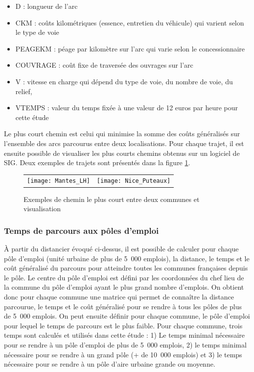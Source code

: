 \documentclass[10.5pt,a4paper]{article}
\begin{document}
{\begin{itemize}[font=\tiny]
	\item D : longueur de l'arc
	\item CKM : coûts kilométriques (essence, entretien du véhicule) qui varient selon le type de voie
	\item PEAGEKM : péage par kilomètre sur l'arc qui varie selon le concessionnaire
	\item COUVRAGE : coût fixe de traversée des ouvrages sur l'arc
	\item V : vitesse en charge qui dépend du type de voie, du nombre de voie, du relief, 
	\item VTEMPS : valeur du temps fixée à une valeur de 12 euros par heure pour cette étude
\end{itemize}

Le plus court chemin est celui qui minimise la somme des coûts généralisés sur l'ensemble des arcs parcourus entre deux localisations. Pour chaque trajet, il est ensuite possible de visualiser les plus courts chemins obtenus sur un logiciel de SIG. Deux exemples de trajets sont présentés dans la figure \ref{path_MODEV}. \par

\begin{figure}[h!]%
\caption{Exemples de chemin le plus court entre deux communes et visualisation}
\begin{tabular}{cc}
\texttt{[image: Mantes\_LH]}  & \texttt{[image: Nice\_Puteaux]}  \\
\end{tabular}
\label{path_MODEV}
\end{figure}

\subsubsection{Temps de parcours aux pôles d'emploi}

\`{A} partir du distancier évoqué ci-dessus, il est possible de calculer pour chaque pôle d'emploi (unité urbaine de plus de 5~000 emplois), la distance, le temps et  le coût généralisé du parcours pour atteindre toutes les communes françaises depuis le pôle. Le centre du pôle d'emploi est défini par les coordonnées du chef lieu de la commune du pôle d'emploi ayant le plus grand nombre d'emplois. On obtient donc pour chaque commune une matrice qui permet de connaître la distance parcourue, le temps et  le coût généralisé pour se rendre à tous les pôles de plus de 5~000 emplois. On peut ensuite définir pour chaque commune, le pôle d'emploi pour lequel le temps de parcours est le plus faible. Pour chaque commune, trois temps sont calculés et utilisés dans cette étude : 1) Le temps minimal nécessaire pour se rendre à un pôle d'emploi de plus de 5~000 emplois, 2) le temps minimal nécessaire pour se rendre à un grand pôle (+ de 10~000 emplois) et 3) le temps nécessaire pour se rendre à un pôle d'aire urbaine grande ou moyenne. \par 

}
\end{document}
